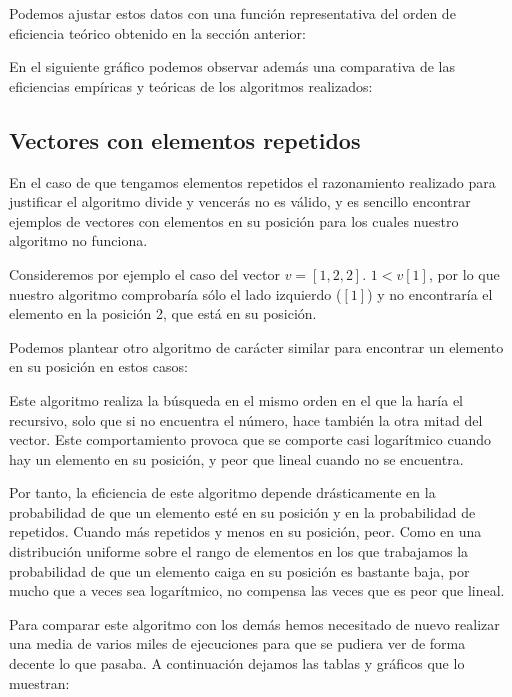 \pgfplotstabletypeset[
display columns/0/.style={column name=Tamaño},
display columns/1/.style={column name=Algoritmo Obvio},
display columns/2/.style={column name=Algoritmo DyV (rec)},
skip rows between index={25}{50}
]{\posObvio}

\vspace*{1cm}

Podemos ajustar estos datos con una función representativa del orden de eficiencia teórico obtenido en la sección anterior:


En el siguiente gráfico podemos observar además una comparativa de las eficiencias empíricas y teóricas de los algoritmos realizados:




\subsection{Vectores con elementos repetidos}

En el caso de que tengamos elementos repetidos el razonamiento realizado para justificar el algoritmo divide y vencerás no es válido, y es sencillo encontrar ejemplos de vectores con elementos en su posición para los cuales nuestro algoritmo no funciona.

Consideremos por ejemplo el caso del vector $v = [1,2,2]$. $1 <v[1]$, por lo que nuestro algoritmo comprobaría sólo el lado izquierdo ($[1]$) y no encontraría el elemento en la posición 2, que está en su posición.

Podemos plantear otro algoritmo de carácter similar para encontrar un elemento en su posición en estos casos:



Este algoritmo realiza la búsqueda en el mismo orden en el que la haría el recursivo, solo que si no encuentra el número, hace también la otra mitad del vector. Este comportamiento provoca que se comporte casi logarítmico cuando hay un elemento en su posición, y peor que lineal cuando no se encuentra.

Por tanto, la eficiencia de este algoritmo depende drásticamente en la probabilidad de que un elemento esté en su posición y en la probabilidad de repetidos. Cuando más repetidos y menos en su posición, peor. Como en una distribución uniforme sobre el rango de elementos en los que trabajamos la probabilidad de que un elemento caiga en su posición es bastante baja, por mucho que a veces sea logarítmico, no compensa las veces que es peor que lineal.

Para comparar este algoritmo con los demás hemos necesitado de nuevo realizar una media de varios miles de ejecuciones para que se pudiera ver de forma decente lo que pasaba. A continuación dejamos las tablas y gráficos que lo muestran:
